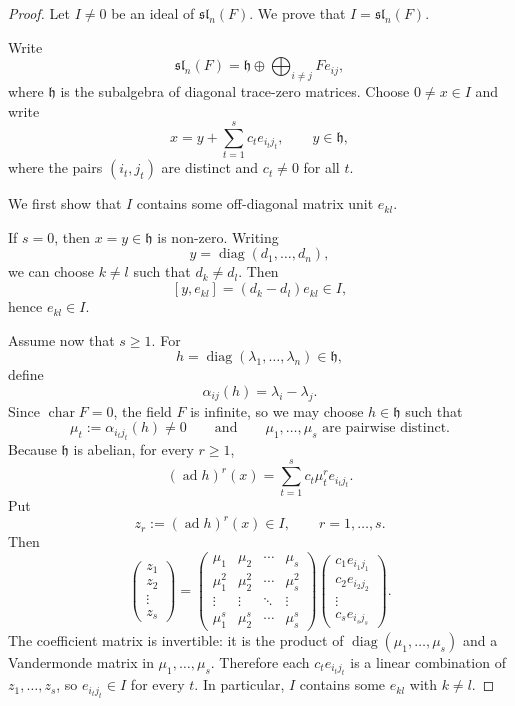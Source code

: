 \begin{proof}
    Let $I\neq 0$ be an ideal of $\mathfrak{sl}_n(F)$. We prove that $I=\mathfrak{sl}_n(F)$.

    Write
    \[
        \mathfrak{sl}_n(F)=\mathfrak{h}\oplus \bigoplus_{i\neq j}Fe_{ij},
    \]
    where $\mathfrak{h}$ is the subalgebra of diagonal trace-zero matrices. Choose $0\neq x\in I$ and write
    \[
        x=y+\sum_{t=1}^s c_t e_{i_tj_t},
        \qquad y\in\mathfrak{h},
    \]
    where the pairs $(i_t,j_t)$ are distinct and $c_t\neq 0$ for all $t$.

    We first show that $I$ contains some off-diagonal matrix unit $e_{kl}$.

    If $s=0$, then $x=y\in\mathfrak{h}$ is non-zero. Writing
    \[
        y=\operatorname{diag}(d_1,\dots,d_n),
    \]
    we can choose $k\neq l$ such that $d_k\neq d_l$. Then
    \[
        [y,e_{kl}]=(d_k-d_l)e_{kl}\in I,
    \]
    hence $e_{kl}\in I$.

    Assume now that $s\geq 1$. For
    \[
        h=\operatorname{diag}(\lambda_1,\dots,\lambda_n)\in\mathfrak{h},
    \]
    define
    \[
        \alpha_{ij}(h)=\lambda_i-\lambda_j.
    \]
    Since $\operatorname{char}F=0$, the field $F$ is infinite, so we may choose $h\in\mathfrak{h}$ such that
    \[
        \mu_t:=\alpha_{i_tj_t}(h)\neq 0
        \qquad\text{and}\qquad
        \mu_1,\dots,\mu_s
        \text{ are pairwise distinct.}
    \]
    Because $\mathfrak{h}$ is abelian, for every $r\geq 1$,
    \[
        (\operatorname{ad}h)^r(x)=\sum_{t=1}^s c_t\mu_t^r e_{i_tj_t}.
    \]
    Put
    \[
        z_r:=(\operatorname{ad}h)^r(x)\in I,
        \qquad r=1,\dots,s.
    \]
    Then
    \[
        \begin{pmatrix}
            z_1    \\
            z_2    \\
            \vdots \\
            z_s
        \end{pmatrix}
        =
        \begin{pmatrix}
            \mu_1   & \mu_2   & \cdots & \mu_s   \\
            \mu_1^2 & \mu_2^2 & \cdots & \mu_s^2 \\
            \vdots  & \vdots  & \ddots & \vdots  \\
            \mu_1^s & \mu_2^s & \cdots & \mu_s^s
        \end{pmatrix}
        \begin{pmatrix}
            c_1e_{i_1j_1} \\
            c_2e_{i_2j_2} \\
            \vdots        \\
            c_se_{i_sj_s}
        \end{pmatrix}.
    \]
    The coefficient matrix is invertible: it is the product of $\operatorname{diag}(\mu_1,\dots,\mu_s)$ and a Vandermonde matrix in $\mu_1,\dots,\mu_s$. Therefore each $c_t e_{i_tj_t}$ is a linear combination of $z_1,\dots,z_s$, so $e_{i_tj_t}\in I$ for every $t$. In particular, $I$ contains some $e_{kl}$ with $k\neq l$.


\end{proof}
